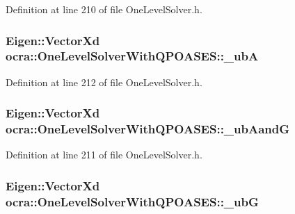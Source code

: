 Definition at line 210 of file One\+Level\+Solver.\+h.

\subsubsection[{\texorpdfstring{\+\_\+ubA}{_ubA}}]{\setlength{\rightskip}{0pt plus 5cm}Eigen\+::\+Vector\+Xd ocra\+::\+One\+Level\+Solver\+With\+Q\+P\+O\+A\+S\+E\+S\+::\+\_\+ubA\hspace{0.3cm}{\ttfamily [protected]}}\hypertarget{classocra_1_1OneLevelSolverWithQPOASES_a9e476513e7486c38bdb69c8fdd3b35d1}{}\label{classocra_1_1OneLevelSolverWithQPOASES_a9e476513e7486c38bdb69c8fdd3b35d1}


Definition at line 212 of file One\+Level\+Solver.\+h.

\subsubsection[{\texorpdfstring{\+\_\+ub\+AandG}{_ubAandG}}]{\setlength{\rightskip}{0pt plus 5cm}Eigen\+::\+Vector\+Xd ocra\+::\+One\+Level\+Solver\+With\+Q\+P\+O\+A\+S\+E\+S\+::\+\_\+ub\+AandG\hspace{0.3cm}{\ttfamily [protected]}}\hypertarget{classocra_1_1OneLevelSolverWithQPOASES_afa4902490254547640625dc2d9512577}{}\label{classocra_1_1OneLevelSolverWithQPOASES_afa4902490254547640625dc2d9512577}


Definition at line 211 of file One\+Level\+Solver.\+h.

\subsubsection[{\texorpdfstring{\+\_\+ubG}{_ubG}}]{\setlength{\rightskip}{0pt plus 5cm}Eigen\+::\+Vector\+Xd ocra\+::\+One\+Level\+Solver\+With\+Q\+P\+O\+A\+S\+E\+S\+::\+\_\+ubG\hspace{0.3cm}{\ttfamily [protected]}}\hypertarget{classocra_1_1OneLevelSolverWithQPOASES_ac3b8f982ead7c50e7396d99e63f02ac3}{}\label{classocra_1_1OneLevelSolverWithQPOASES_ac3b8f982ead7c50e7396d99e63f02ac3}


